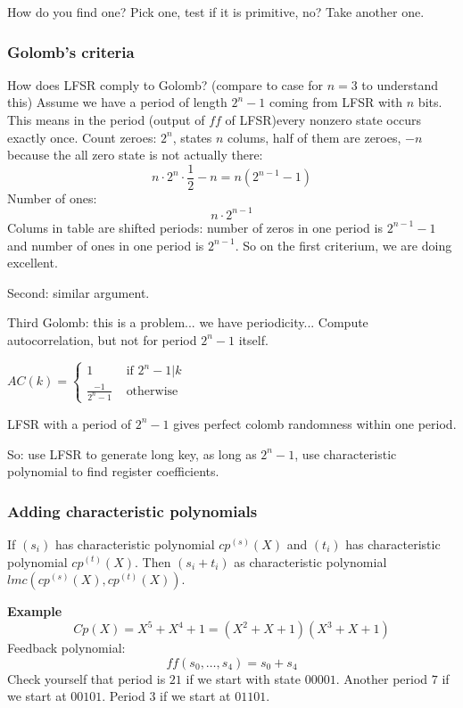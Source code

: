 \documentclass[language=english,number=]{homework}
\begin{document}
How do you find one?
Pick one, test if it is primitive, no?
Take another one.

\subsubsection{Golomb's criteria}
How does LFSR comply to Golomb?
(compare to case for $n=3$ to understand this)
Assume we have a period of length $2^{n}-1$ coming from LFSR with $n$ bits.
This means in the period (output of $ff$ of LFSR)every nonzero state occurs exactly once.
Count zeroes: $2^n$, states $n$ colums, half of them are zeroes, $-n$ because the all zero state is not actually there:
\[
n \cdot 2^n \cdot \frac{1}{2} - n = n(2^{n-1} - 1)
\]
Number of ones:
\[
n \cdot 2^{n-1}
\]
Colums in table are shifted periods: number of zeros in one period is $2^{n-1}-1$ and number of ones in one period is $2^{n-1}$.
So on the first criterium, we are doing excellent.

Second: similar argument.

Third Golomb: this is a problem... we have periodicity...
Compute autocorrelation, but not for period $2^{n}-1$ itself.

\begin{theorem}
$AC(k) = \begin{cases}
1 &\text{ if } 2^n - 1 | k \\
\frac{-1}{2^n - 1} &\text{ otherwise}
\end{cases}$
\end{theorem}

LFSR with a period of $2^{n}-1$ gives perfect colomb randomness within one period.

So: use LFSR to generate long key, as long as $2^n - 1$, use characteristic polynomial to find register coefficients.

\subsubsection{Adding characteristic polynomials}

\begin{theorem}
If $(s_i)$ has characteristic polynomial $cp^{(s)}(X)$ and $(t_i)$ has characteristic polynomial $cp^{(t)}(X)$.
Then $(s_i + t_i)$ as characteristic polynomial $lmc(cp^{(s)}(X), cp^{(t)}(X))$.
\end{theorem}

\textbf{Example}
\[
Cp(X) = X^5 + X^4 + 1 = (X^2 + X + 1)(X^3 + X + 1)
\]
Feedback polynomial:
\[
ff(s_0, \dots, s_4) = s_0 + s_4
\]
Check yourself that period is $21$ if we start with state $00001$.
Another period $7$ if we start at $00101$.
Period $3$ if we start at $01101$.
\end{document}
